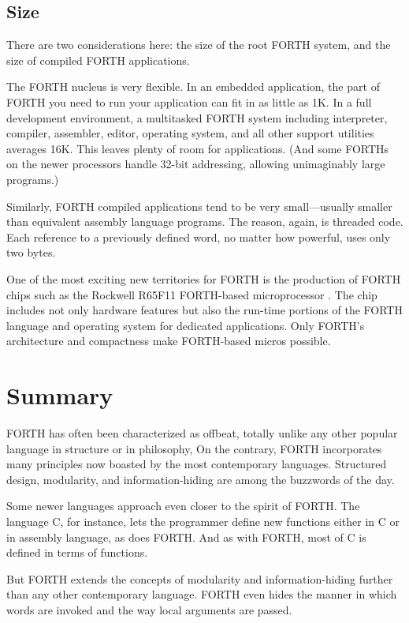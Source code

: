 \subsection{Size}
There are two considerations here: the size of the root FORTH system,
and the size of compiled FORTH applications.

The FORTH nucleus is very flexible. In an embedded application, the
part of FORTH you need to run your application can fit in as little
as 1K. In a full development environment, a multitasked FORTH system
including interpreter, compiler, assembler,
editor, operating system, and all other support utilities averages
16K. This leaves plenty of room for applications. (And some FORTHs on
the newer processors handle 32-bit addressing, allowing unimaginably
large programs.)

Similarly, FORTH compiled applications tend to be very small---usually
smaller than equivalent assembly language programs. The reason, again,
is threaded code. Each reference to a previously defined word, no
matter how powerful, uses only two bytes.

One of the most exciting new territories for FORTH is the production
of FORTH chips such as the
Rockwell R65F11 FORTH-based microprocessor
\cite{dumse}. The chip includes not only hardware features but also
the run-time portions of the FORTH language and operating system for
dedicated applications. Only FORTH's architecture and compactness make
FORTH-based micros possible.


\section{Summary}
FORTH has often been characterized as offbeat, totally unlike any
other popular language in structure or in philosophy, On the contrary,
FORTH incorporates many principles now boasted by the most
contemporary languages. Structured design, modularity, and
information-hiding are among the buzzwords of the day.

Some newer languages approach even closer to the spirit of FORTH.  The
language C, for instance, lets the programmer define new functions
either in C or in assembly language, as does FORTH. And as with FORTH,
most of C is defined in terms of functions.

But FORTH extends the concepts of modularity and information-hiding
further than any other contemporary language. FORTH even hides the
manner in which words are invoked and the way local arguments are
passed.

